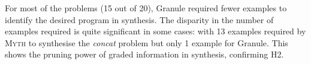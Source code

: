\begin{table}[H]
\begin{center}
\setlength{\tabcolsep}{0.3em}
\end{center}
\vspace{0.5em}
\caption{Number of examples needed for synthesis, comparing Granule vs. \textsc{Myth}}
\label{tab:example-comp}
\end{table}


For most of the problems (15 out of 20), Granule required fewer examples to identify the desired
program in synthesis. The disparity in the number of examples required is quite significant in some cases: with
13 examples required by \textsc{Myth} to synthesise the \emph{concat} problem but only 1 example for
Granule. This shows the pruning power of graded information in synthesis, confirming H2.



